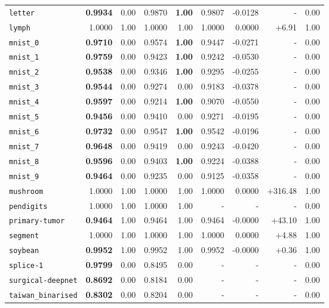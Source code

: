 \begin{tabular}{lrrrrrrrr}
\texttt{letter} & \textbf{0.9934} & 0.00 & 0.9870 & \textbf{1.00} & 0.9807 & -0.0128 & - & 0.00\\
\texttt{lymph} & 1.0000 & 1.00 & 1.0000 & 1.00 & 1.0000 & 0.0000 & +6.91 & 1.00\\
\texttt{mnist\_0} & \textbf{0.9710} & 0.00 & 0.9574 & \textbf{1.00} & 0.9447 & -0.0271 & - & 0.00\\
\texttt{mnist\_1} & \textbf{0.9759} & 0.00 & 0.9423 & \textbf{1.00} & 0.9242 & -0.0530 & - & 0.00\\
\texttt{mnist\_2} & \textbf{0.9538} & 0.00 & 0.9346 & \textbf{1.00} & 0.9295 & -0.0255 & - & 0.00\\
\texttt{mnist\_3} & \textbf{0.9544} & 0.00 & 0.9274 & 0.00 & 0.9183 & -0.0378 & - & 0.00\\
\texttt{mnist\_4} & \textbf{0.9597} & 0.00 & 0.9214 & \textbf{1.00} & 0.9070 & -0.0550 & - & 0.00\\
\texttt{mnist\_5} & \textbf{0.9456} & 0.00 & 0.9410 & 0.00 & 0.9271 & -0.0195 & - & 0.00\\
\texttt{mnist\_6} & \textbf{0.9732} & 0.00 & 0.9547 & \textbf{1.00} & 0.9542 & -0.0196 & - & 0.00\\
\texttt{mnist\_7} & \textbf{0.9648} & 0.00 & 0.9419 & 0.00 & 0.9243 & -0.0420 & - & 0.00\\
\texttt{mnist\_8} & \textbf{0.9596} & 0.00 & 0.9403 & \textbf{1.00} & 0.9224 & -0.0388 & - & 0.00\\
\texttt{mnist\_9} & \textbf{0.9464} & 0.00 & 0.9235 & 0.00 & 0.9125 & -0.0358 & - & 0.00\\
\texttt{mushroom} & 1.0000 & 1.00 & 1.0000 & 1.00 & 1.0000 & 0.0000 & +316.48 & 1.00\\
\texttt{pendigits} & 1.0000 & 1.00 & 1.0000 & 1.00 & - & - & - & 0.00\\
\texttt{primary-tumor} & \textbf{0.9464} & 1.00 & 0.9464 & 1.00 & 0.9464 & -0.0000 & +43.10 & 1.00\\
\texttt{segment} & 1.0000 & 1.00 & 1.0000 & 1.00 & 1.0000 & 0.0000 & +4.88 & 1.00\\
\texttt{soybean} & \textbf{0.9952} & 1.00 & 0.9952 & 1.00 & 0.9952 & -0.0000 & +0.36 & 1.00\\
\texttt{splice-1} & \textbf{0.9799} & 0.00 & 0.8495 & 0.00 & - & - & - & 0.00\\
\texttt{surgical-deepnet} & \textbf{0.8692} & 0.00 & 0.8184 & 0.00 & - & - & - & 0.00\\
\texttt{taiwan\_binarised} & \textbf{0.8302} & 0.00 & 0.8204 & 0.00 & - & - & - & 0.00\\

\end{tabular}
